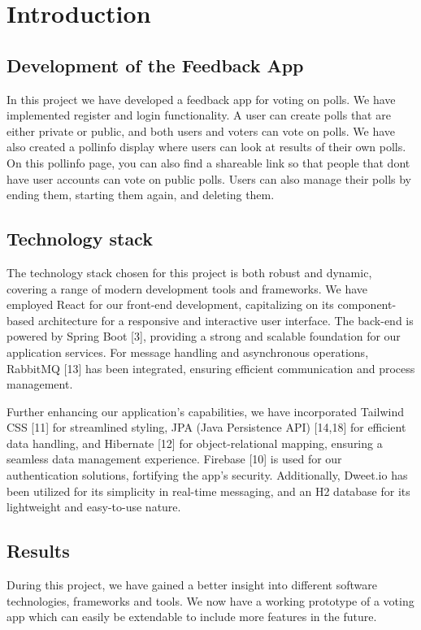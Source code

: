 \setlength{\parskip}{1em} %
\setlength{\parindent}{0pt} %

\section{Introduction}
\label{sec:introduction}

\subsection{Development of the Feedback App}
In this project we have developed a feedback app for voting on polls. We have implemented register and login functionality. A user can create polls that are either private or public, and both users and voters can vote on polls. 
We have also created a pollinfo display where users can look at results of their own polls. On this pollinfo page, you can also find a shareable link so that people that dont have user accounts can vote on public polls. 
Users can also manage their polls by ending them, starting them again, and deleting them. 

\subsection{Technology stack}
The technology stack chosen for this project is both robust and dynamic, covering a range of modern development tools and frameworks. 
We have employed React for our front-end development, capitalizing on its component-based architecture for a responsive and interactive user interface. 
The back-end is powered by Spring Boot [3], providing a strong and scalable foundation for our application services. For message handling and asynchronous operations, RabbitMQ [13] has been integrated, ensuring efficient communication and process management. 

Further enhancing our application's capabilities, we have incorporated Tailwind CSS [11] for streamlined styling, JPA (Java Persistence API) [14,18] for efficient data handling, and Hibernate [12] for object-relational mapping, ensuring a seamless data management experience. 
Firebase [10]  is used for our authentication solutions, fortifying the app's security. 
Additionally, Dweet.io has been utilized for its simplicity in real-time messaging, and an H2 database for its lightweight and easy-to-use nature.

\subsection{Results}
During this project, we have gained a better insight into different software technologies, frameworks and tools. 
We now have a working prototype of a voting app which can easily be extendable to include more features in the future. 

